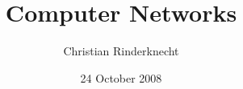 \documentclass[compress,dvips,xcolor={dvipsnames},t]{beamer}
\title{Computer Networks}
\author{Christian Rinderknecht}
\date{24 October 2008}
\begin{document}
\frame{\maketitle}













\end{document}
